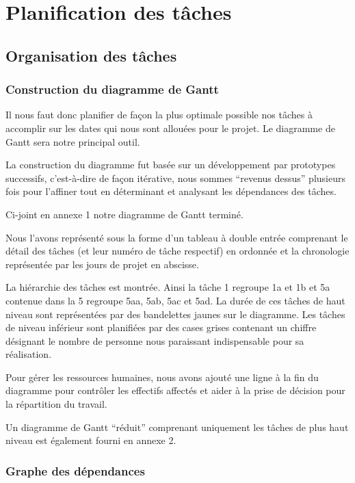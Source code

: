\documentclass[a4paper,12pt]{article} %
\begin{document}
\newpage
\section{Planification des tâches}

  \subsection{Organisation des tâches}

	\subsubsection{Construction du diagramme de Gantt}

Il  nous faut donc planifier de façon la plus optimale possible nos tâches à accomplir sur les dates qui nous sont allouées pour le projet. Le diagramme de Gantt sera notre principal outil.

La construction du diagramme fut basée sur un développement par prototypes successifs, c’est-à-dire de façon itérative, nous sommes “revenus dessus” plusieurs fois pour l’affiner tout en déterminant et analysant les dépendances des tâches.

Ci-joint en annexe 1 notre diagramme de Gantt terminé.

Nous l’avons représenté sous la forme d’un tableau à double entrée comprenant le détail des tâches (et leur numéro de tâche respectif) en ordonnée et la chronologie représentée par les jours de projet en abscisse.

La hiérarchie des tâches est montrée. Ainsi la tâche 1 regroupe 1a et 1b et 5a contenue dans la 5 regroupe 5aa, 5ab, 5ac et 5ad. La durée de ces tâches de haut niveau sont représentées par des bandelettes jaunes sur le diagramme. Les tâches de niveau inférieur sont planifiées par des cases grises contenant un chiffre désignant le nombre de personne nous paraissant indispensable pour sa réalisation.

Pour gérer les ressources humaines, nous avons ajouté une ligne à la fin du diagramme pour contrôler les effectifs affectés et aider à la prise de décision pour la répartition du travail.

Un diagramme de Gantt “réduit” comprenant uniquement les tâches de plus haut niveau est également fourni en annexe 2.

\newpage
	\subsubsection{Graphe des dépendances}
\end{document}
